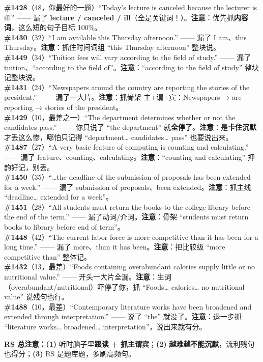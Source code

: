 \documentclass[11pt]{article}
\newcommand{\hl}[1]{\textcolor{cWrong}{\bfseries #1}}   %
\begin{document}
\begin{notebox}\small
\textbf{\#1428}（48，你最好的一题）``Today's lecture is canceled because the lecturer is ill.'' —— 漏了 \hl{lecture / canceled / ill}（全是关键词！）。\textbf{注意}：优先抓\textbf{内容词}，这么短的句子目标 100\%。\\[3pt]
\textbf{\#1430}（32）``I am available this Thursday afternoon.'' —— 漏了 I am、this Thursday。\textbf{注意}：抓住时间词组 ``this Thursday afternoon'' 整块说。\\[3pt]
\textbf{\#1449}（34）``Tuition fees will vary according to the field of study.'' —— 漏了 tuition、``according to the field of''。\textbf{注意}：``according to the field of study'' 整块记整块说。\\[3pt]
\textbf{\#1431}（24）``Newspapers around the country are reporting the stories of the president.'' —— 漏了一大片。\textbf{注意}：抓骨架 主+谓+宾：Newspapers → are reporting → stories of the president。\\[3pt]
\textbf{\#1429}（10，最差之一）``The department determines whether or not the candidates pass.'' —— 你只说了 ``the department'' 就\textbf{全停了}。\textbf{注意}：是\textbf{卡住沉默}才丢这么惨，哪怕只记得 ``department… candidates… pass'' 也要说出来。\\[3pt]
\textbf{\#1487}（27）``A very basic feature of computing is counting and calculating.'' —— 漏了 feature、counting、calculating。\textbf{注意}：``counting and calculating'' 押韵好记，别丢。\\[3pt]
\textbf{\#1450}（35）``…the deadline of the submission of proposals has been extended for a week.'' —— 漏了 submission of proposals、been extended。\textbf{注意}：抓主线 ``deadline… extended for a week''。\\[3pt]
\textbf{\#1451}（28）``All students must return the books to the college library before the end of the term.'' —— 漏了动词/介词。\textbf{注意}：骨架 ``students must return books to library before end of term''。\\[3pt]
\textbf{\#1448}（42）``The current labor force is more competitive than it has been for a long time.'' —— 漏了 more、than it has been。\textbf{注意}：把比较级 ``more competitive than'' 整体记。\\[3pt]
\textbf{\#1432}（13，最差）``Foods containing overabundant calories supply little or no nutritional value.'' —— 开头一大片全漏。\textbf{注意}：生词（overabundant/nutritional）吓停了你，抓 ``Foods… calories… no nutritional value'' 说残句也行。\\[3pt]
\textbf{\#1488}（10，最差）``Contemporary literature works have been broadened and extended through interpretation.'' —— 说了 ``the'' 就没了。\textbf{注意}：退一步抓 ``literature works… broadened… interpretation''，说出来就有分。
\end{notebox}
\textbf{RS 总注意：}\textbf{(1)} 听时脑子里\textbf{跟读 + 抓主谓宾}；\textbf{(2)} \textbf{越难越不能沉默}，流利残句也得分；\textbf{(3)} RS 是题库题，多刷高频句。
\end{document}
